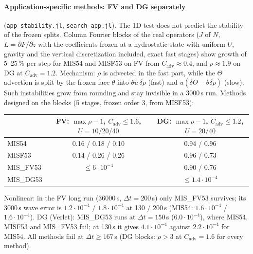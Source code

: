 \documentclass[11pt,a4paper]{article}
\newcommand{\code}[1]{\texttt{#1}}
\newcommand{\dt}{\Delta t}
\begin{document}
\paragraph{Application-specific methods: FV and DG separately} (\code{app\_stability.jl},
\code{search\_app.jl}). The 1D test does not predict the stability of the frozen splits. Column
Fourier blocks of the real operators ($J$ of $N$, $L=\partial F/\partial z$ with the coefficients
frozen at a hydrostatic state with uniform $U$, gravity and the vertical discretization included,
exact fast stages) show growth of 5--25\,\% per step for MIS54 and MISF53 on FV from
$C_\mathrm{adv}\approx0.4$, and $\rho\approx1.9$ on DG at $C_\mathrm{adv}=1.2$. Mechanism: $\rho$ is
advected in the fast part, while the $\Theta$ advection is split by the frozen face $\theta$ into
$\bar\theta\bar u\,\delta\rho$ (fast) and $\bar u(\delta\Theta-\bar\theta\delta\rho)$ (slow). Such
instabilities grow from rounding and stay invisible in a 3000\,s run. Methods designed on the
blocks (5 stages, frozen order 3, from MISF53):
\begin{center}
\begin{tabular}{lcc}
\toprule
& FV: $\max\rho-1$, $C_\mathrm{adv}\le1.6$, $U=10/20/40$ & DG: $\max\rho-1$, $C_\mathrm{adv}\le1.2$, $U=20/40$\\
\midrule
MIS54 & 0.16 / 0.18 / 0.10 & 0.94 / 0.96\\
MISF53 & 0.14 / 0.26 / 0.26 & 0.96 / 0.73\\
MIS\_FV53 & $\le6\cdot10^{-4}$ & 0.90 / 0.76\\
MIS\_DG53 & & $\le1.4\cdot10^{-4}$\\
\bottomrule
\end{tabular}
\end{center}
Nonlinear: in the FV long run (36000\,s, $\dt=200$\,s) only MIS\_FV53 survives; its 3000\,s wave error
is $1.2\cdot10^{-4}$ / $1.8\cdot10^{-4}$ at 130 / 200\,s (MIS54: $1.6\cdot10^{-4}$ / $1.6\cdot10^{-4}$). DG
(Verlet): MIS\_DG53 runs at $\dt=150$\,s ($6.0\cdot10^{-4}$), where MIS54, MISF53 and MIS\_FV53 fail; at
130\,s it gives $4.1\cdot10^{-4}$ against $2.2\cdot10^{-4}$ for MIS54. All methods fail at $\dt\ge167$\,s
(DG blocks: $\rho>3$ at $C_\mathrm{adv}=1.6$ for every method).
\end{document}
